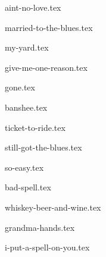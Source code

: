 \begin{songs}{}
  {aint-no-love.tex}
  \sclearpage

  {married-to-the-blues.tex}
  \sclearpage

  {my-yard.tex}
  \sclearpage

  {give-me-one-reason.tex}
  \sclearpage

  {gone.tex}
  \sclearpage

  {banshee.tex}
  \sclearpage

  {ticket-to-ride.tex}
  \sclearpage

  {still-got-the-blues.tex}
  \sclearpage

  {so-easy.tex}
  \sclearpage





  {bad-spell.tex}
  \sclearpage

  {whiskey-beer-and-wine.tex}
  \sclearpage

  {grandma-hands.tex}
  \sclearpage

  {i-put-a-spell-on-you.tex}
  \sclearpage

\end{songs}
